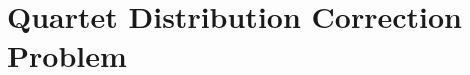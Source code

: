 \documentclass[10pt,a4paper]{article}
\begin{document}

\section{Quartet Distribution Correction Problem}
\end{document}

